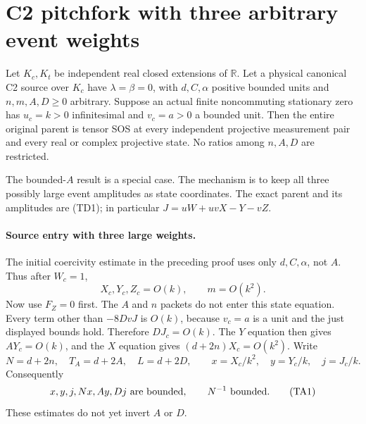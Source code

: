 \section{C2 pitchfork with three arbitrary event weights}
\label{sec:c2-three-large}

\begin{theorem}
\label{thm:c2-three-large}
Let $K_c,K_t$ be independent real closed extensions of $\mathbb R$.
Let a physical canonical C2 source over $K_c$ have $\lambda=\beta=0$,
with $d,C,\alpha$ positive bounded units and
$n,m,A,D\geq0$ arbitrary. Suppose an actual finite noncommuting
stationary zero has $u_c=k>0$ infinitesimal and $v_c=a>0$ a bounded
unit. Then the entire original parent is tensor SOS at every
independent projective measurement pair and every real or complex
projective state. No ratios among $n,A,D$ are restricted.
\end{theorem}

The bounded-$A$ result is a special case. The mechanism is to keep
all three possibly large event amplitudes as state coordinates.
The exact parent and its amplitudes are (TD1); in particular
$J=uW+uvX-Y-vZ$.

\paragraph{Source entry with three large weights.}
The initial coercivity estimate in the preceding proof uses only
$d,C,\alpha$, not $A$. Thus after $W_c=1$,
\[
 X_c,Y_c,Z_c=O(k),\qquad m=O(k^2).
\]
Now use $F_Z=0$ first. The $A$ and $n$ packets do not enter this
state equation. Every term other than $-8DvJ$ is $O(k)$, because
$v_c=a$ is a unit and the just displayed bounds hold. Therefore
$DJ_c=O(k)$. The $Y$ equation then gives $AY_c=O(k)$, and the $X$
equation gives $(d+2n)X_c=O(k^2)$. Write
\[
 N=d+2n,\quad T_A=d+2A,\quad L=d+2D,\qquad
 x=X_c/k^2,\quad y=Y_c/k,\quad j=J_c/k.
\]
Consequently
\[
 x,y,j,Nx,Ay,Dj\ \hbox{are bounded},\qquad N^{-1}\ \hbox{bounded}.
                                                               \tag{TA1}
\]
These estimates do not yet invert $A$ or $D$.

